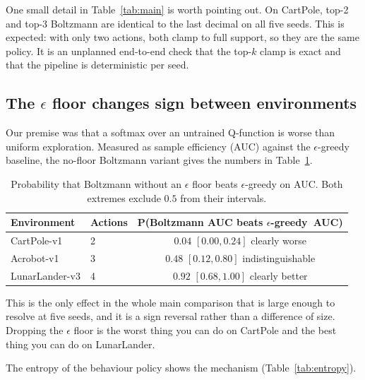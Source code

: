 \documentclass[11pt,a4paper]{article}
\newcommand{\eg}{$\epsilon$-greedy}
\begin{document}
One small detail in Table~\ref{tab:main} is worth pointing out. On CartPole,
top-2 and top-3 Boltzmann are identical to the last decimal on all five seeds.
This is expected: with only two actions, both clamp to full support, so they
are the same policy. It is an unplanned end-to-end check that the top-$k$ clamp
is exact and that the pipeline is deterministic per seed.

\subsection{The $\epsilon$ floor changes sign between environments}
\label{sec:res-signflip}

Our premise was that a softmax over an untrained Q-function is worse than
uniform exploration. Measured as sample efficiency (AUC) against the
$\epsilon$-greedy baseline, the no-floor Boltzmann variant gives the numbers in
Table~\ref{tab:signflip}.

\begin{table}[h]
\centering
\small
\caption{Probability that Boltzmann without an $\epsilon$ floor beats
$\epsilon$-greedy on AUC. Both extremes exclude $0.5$ from their intervals.}
\label{tab:signflip}
\begin{tabular}{llc}
\toprule
Environment & Actions & P(Boltzmann AUC beats \eg\ AUC) \\
\midrule
CartPole-v1 & 2 & $\mathbf{0.04}$ $[0.00, 0.24]$ \quad clearly worse \\
Acrobot-v1 & 3 & $0.48$ $[0.12, 0.80]$ \quad indistinguishable \\
LunarLander-v3 & 4 & $\mathbf{0.92}$ $[0.68, 1.00]$ \quad clearly better \\
\bottomrule
\end{tabular}
\end{table}

This is the only effect in the whole main comparison that is large enough to
resolve at five seeds, and it is a sign reversal rather than a difference of
size. Dropping the $\epsilon$ floor is the worst thing you can do on CartPole
and the best thing you can do on LunarLander.

The entropy of the behaviour policy shows the mechanism (Table~\ref{tab:entropy}).
\end{document}
